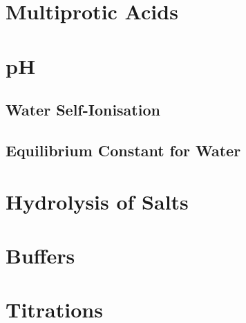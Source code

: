 \documentclass[a4paper,11pt]{article}
\begin{document}
\section{Multiprotic Acids}

\section{pH}

\subsection{Water Self-Ionisation}

\subsection{Equilibrium Constant for Water}

\section{Hydrolysis of Salts}

\section{Buffers}

\section{Titrations}
\end{document}
